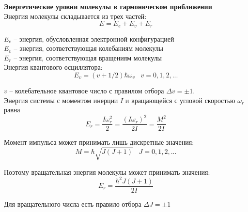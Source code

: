 \documentclass{article}
\begin{document}
	\textbf{Энергетические уровни молекулы в гармоническом приближении}\\

	Энергия молекулы складывается из трех частей:
	\begin{equation}
		E = E_e + E_v + E_r
	\end{equation}

	$E_e$ -- энергия, обусловленная электронной конфигурацией\\

	$E_v$ -- энергия, соответствующая колебаниям молекулы\\

	$E_r$ -- энергия, соответствующая вращениям молекулы\\

	Энергия квантового осциллятора:
	\begin{equation}
		E_v = (v+1/2)\hbar\omega_v\;\;\;v=0,1,2,...
	\end{equation}

	$v$ -- колебательное квантовое число с правилом отбора $\Delta v = \pm 1$.\\

	Энергия системы с моментом инерции $I$ и вращающейся с угловой скоростью $\omega_r$ равна
	\begin{equation}
		E_r = \frac{I\omega_r^2}{2}=\frac{(I\omega_r)^2}{2I}=\frac{M^2}{2I}
	\end{equation}

	Момент импульса может принимать лишь дискретные значения:
	\begin{equation}
		M=\hbar\sqrt{J(J+1)}\;\;\;J=0,1,2,...
	\end{equation}

	Поэтому вращательная энергия молекулы может принимать значения:
	\begin{equation}
		E_r = \frac{\hbar^2 J(J+1)}{2I}
	\end{equation}

	Для вращательного числа есть правило отбора $\Delta J=\pm 1$
	
\end{document}
